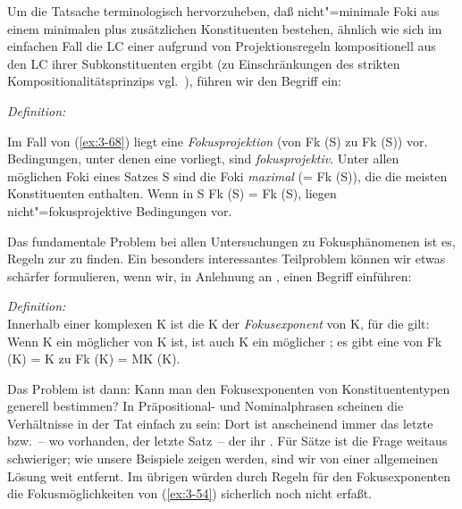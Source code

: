 \documentclass[output=paper]{langsci/langscibook}
\begin{document}
Um die Tatsache terminologisch hervorzuheben, daß nicht"=minimale Foki
aus einem minimalen  plus zusätzlichen Konstituenten bestehen,
ähnlich wie sich im einfachen Fall die LC einer  aufgrund
von Projektionsregeln kompositionell aus den LC ihrer Subkonstituenten
ergibt (zu Einschränkungen des strikten Kompositionalitätsprinzips
vgl.\ \citealt{Hoehle79c}), führen wir den Begriff
 ein:
\begin{exe}
	\ex \textit{Definition:}\label{ex:3-70}
\begin{xlist}
\ex
\label{ex:3-70a}
Im Fall von (\ref{ex:3-68}) liegt eine \textit{Fokusprojektion} (von Fk
(S) zu Fk (S)) vor.  
\ex
\label{ex:3-70b}
Bedingungen, unter denen eine  vorliegt, sind
\textit{fokusprojektiv}. 
\ex
\label{ex:3-70c}
Unter allen möglichen Foki eines Satzes S sind die Foki
\textit{maximal} (= Fk (S)), die die meisten Konstituenten
enthalten.  
\ex
\label{ex:3-70d}
Wenn in S Fk (S) = Fk (S), liegen
nicht"=fokusprojektive Bedingungen vor.
\end{xlist}
\end{exe}
Das fundamentale Problem bei allen Untersuchungen zu Fokusphänomenen
ist es, Regeln zur  zu finden. Ein besonders
interessantes Teilproblem können wir etwas schärfer formulieren, wenn
wir, in Anlehnung an \citet[307f]{Fuchs76}, einen Begriff
 einführen:
\begin{exe}
	\ex\label{ex:3-71}
\textit{Definition:} \\
Innerhalb einer komplexen  K ist die  K
der \textit{Fokusexponent} von K, für die gilt: Wenn K ein möglicher 
von K ist, ist auch K ein möglicher ; \dash es gibt eine
 von Fk (K) = K zu Fk (K) = MK (K).
\end{exe}
Das Problem ist dann: Kann man den Fokusexponenten von
Konstituententypen generell bestimmen? In Präpositional- und
Nominalphrasen scheinen die Verhältnisse in der Tat einfach zu sein:
Dort ist anscheinend immer das letzte  bzw.~-- wo vorhanden,
der letzte Satz~-- der  ihr . Für Sätze ist
die Frage weitaus schwieriger; wie unsere Beispiele zeigen werden,
sind wir von einer allgemeinen Lösung weit entfernt. Im übrigen würden
durch Regeln für den Fokusexponenten \zb die Fokusmöglichkeiten von
(\ref{ex:3-54}) sicherlich noch nicht erfaßt.
\end{document}
